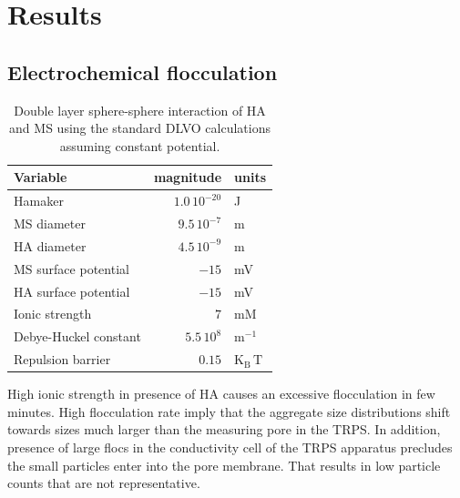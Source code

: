 \documentclass[journal=langd5,manuscript=article]{achemso}
\begin{document}
\section{Results}




\subsection{Electrochemical flocculation}

\begin{table}
\caption{Double layer sphere-sphere interaction  of HA and MS using the standard DLVO calculations assuming constant potential.}
\label{tbl:dvlo_interaction}
\begin{tabular}{lrl}
Variable & magnitude & units\\
\hline
Hamaker & $1.0\,10^{-20}$ & J\\
MS  diameter & $9.5\, 10^{-7}$ & m\\
HA  diameter & $4.5\, 10^{-9}$ & m\\
MS surface potential & $-15$ & mV\\
HA surface potential & $-15$ & mV\\
Ionic strength & $7$ & mM \\
Debye-Huckel constant & $5.5\,10^8$ & $\mathrm{m^{-1}}$\\
Repulsion barrier & $0.15$ & $\mathrm{K_B\,T}$\\
\hline
\end{tabular}
\end{table}



High ionic strength in presence of HA causes an excessive flocculation in
few minutes. 
High flocculation rate imply that the aggregate size distributions shift towards sizes much larger than the measuring pore in the TRPS.
In addition, presence of large flocs in the conductivity cell of the TRPS apparatus precludes the 
small particles enter into the pore membrane. That results in low particle counts that are not representative.
\end{document}
